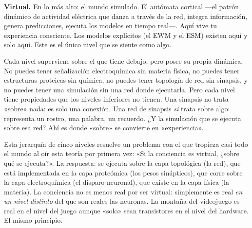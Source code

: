 \documentclass[11pt, twoside, openright]{book}
\begin{document}
\textbf{Virtual.} En lo más alto: el mundo simulado. El autómata cortical ---el patrón dinámico de actividad eléctrica que danza a través de la red, integra información, genera predicciones, ejecuta los modelos en tiempo real---. Aquí vive tu experiencia consciente. Los modelos explícitos (el EWM y el ESM) existen aquí y solo aquí. Este es el único nivel que se siente como algo.

Cada nivel superviene sobre el que tiene debajo, pero posee su propia dinámica. No puedes tener señalización electroquímica sin materia física, no puedes tener estructuras proteicas sin química, no puedes tener topología de red sin sinapsis, y no puedes tener una simulación sin una red donde ejecutarla. Pero cada nivel tiene propiedades que los niveles inferiores no tienen. Una sinapsis no trata «sobre» nada: es solo una conexión. Una red de sinapsis \textit{sí} trata sobre algo: representa un rostro, una palabra, un recuerdo. ¿Y la simulación que se ejecuta sobre esa red? Ahí es donde «sobre» se convierte en «experiencia».

Esta jerarquía de cinco niveles resuelve un problema con el que tropieza casi todo el mundo al oír esta teoría por primera vez: «Si la conciencia es virtual, ¿sobre qué se ejecuta?». La respuesta: se ejecuta sobre la capa topológica (la red), que está implementada en la capa proteómica (los pesos sinápticos), que corre sobre la capa electroquímica (el disparo neuronal), que existe en la capa física (la materia). La conciencia no es menos real por ser virtual: simplemente es real \textit{en un nivel distinto} del que son reales las neuronas. La montaña del videojuego es real en el nivel del juego aunque «solo» sean transistores en el nivel del hardware. El mismo principio.
\end{document}
